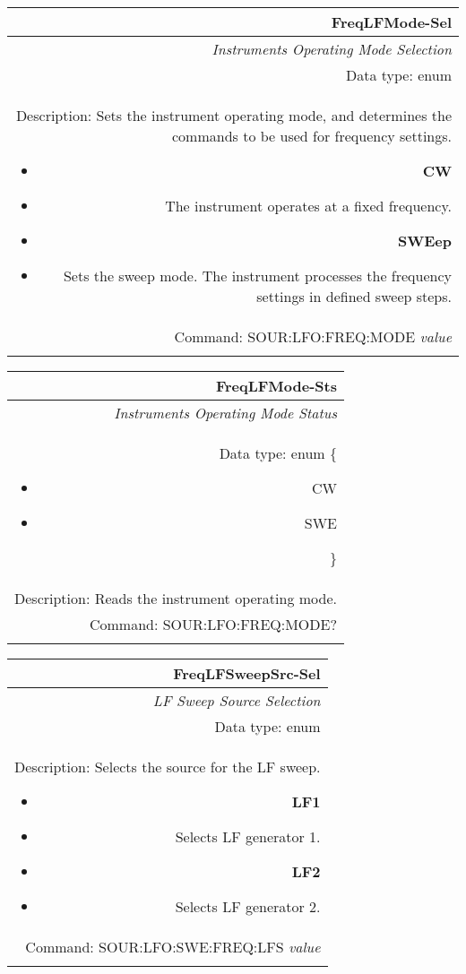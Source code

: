 \documentclass[openany]{article}
\begin{document}
		\begin{tabular}{N}
			\hline
			\bfseries FreqLFMode-Sel \\ \hline
			\emph{Instruments Operating Mode Selection} \\
			Data type: enum \\
			Description: Sets the instrument operating mode, and determines the commands to be used for frequency settings.\begin{itemize}[noitemsep]
				\small
				\item[] \textbf{CW} 
				\item[] The instrument operates at a fixed frequency.
				\item[] \textbf{SWEep}
				\item[] Sets the sweep mode. The instrument processes the frequency settings in defined sweep steps.
			\end{itemize} \\
			Command: SOUR:LFO:FREQ:MODE \emph{value} \\
			\\

		\end{tabular}


		\begin{tabular}{N}
			\hline
			\bfseries FreqLFMode-Sts \\ \hline
			\emph{Instruments Operating Mode Status} \\
			Data type: enum \{\begin{itemize}[noitemsep]
				\small
				\item[] CW
				\item[] SWE
			\end{itemize}\} \\ 
			Description: Reads the instrument operating mode. \\
			Command: SOUR:LFO:FREQ:MODE? \\
			\\

		\end{tabular}


		\begin{tabular}{N}
			\hline
			\bfseries FreqLFSweepSrc-Sel \\ \hline
			\emph{LF Sweep Source Selection} \\
			Data type: enum \\
			Description: Selects the source for the LF sweep.\begin{itemize}[noitemsep]
				\small
				\item[] \textbf{LF1} 
				\item[] Selects LF generator 1.
				\item[] \textbf{LF2}
				\item[] Selects LF generator 2.
			\end{itemize} \\
			Command: SOUR:LFO:SWE:FREQ:LFS \emph{value} \\
			\\

		\end{tabular}
\end{document}

